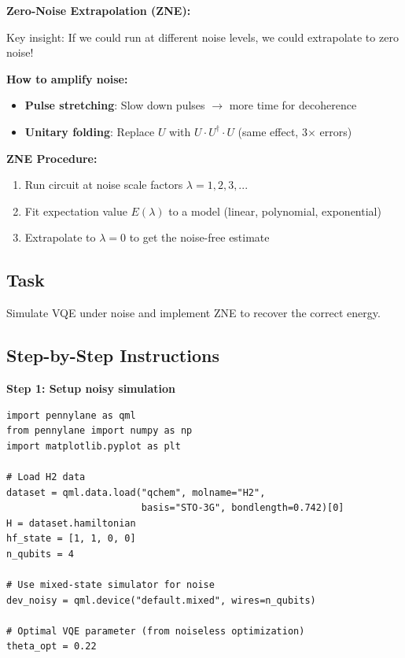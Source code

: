 \documentclass[11pt,a4paper]{article}
\begin{document}
\textbf{Zero-Noise Extrapolation (ZNE):}

Key insight: If we could run at different noise levels, we could extrapolate to zero noise!

\textbf{How to amplify noise:}
\begin{itemize}
    \item \textbf{Pulse stretching}: Slow down pulses $\to$ more time for decoherence
    \item \textbf{Unitary folding}: Replace $U$ with $U \cdot U^\dagger \cdot U$ (same effect, 3$\times$ errors)
\end{itemize}

\textbf{ZNE Procedure:}
\begin{enumerate}
    \item Run circuit at noise scale factors $\lambda = 1, 2, 3, ...$
    \item Fit expectation value $E(\lambda)$ to a model (linear, polynomial, exponential)
    \item Extrapolate to $\lambda = 0$ to get the noise-free estimate
\end{enumerate}

\subsection*{Task}
Simulate VQE under noise and implement ZNE to recover the correct energy.

\subsection*{Step-by-Step Instructions}

\textbf{Step 1: Setup noisy simulation}
\begin{lstlisting}
import pennylane as qml
from pennylane import numpy as np
import matplotlib.pyplot as plt

# Load H2 data
dataset = qml.data.load("qchem", molname="H2",
                        basis="STO-3G", bondlength=0.742)[0]
H = dataset.hamiltonian
hf_state = [1, 1, 0, 0]
n_qubits = 4

# Use mixed-state simulator for noise
dev_noisy = qml.device("default.mixed", wires=n_qubits)

# Optimal VQE parameter (from noiseless optimization)
theta_opt = 0.22
\end{lstlisting}
\end{document}
